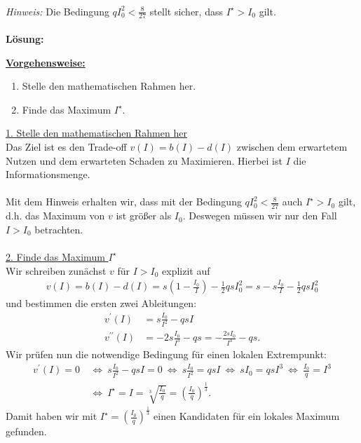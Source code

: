 \\
\textit{Hinweis:} Die Bedingung $q I_0^2 < \frac{8}{27}$ stellt sicher, dass $I^\star > I_0 $ gilt.\\
\\
\textbf{Lösung:}
\begin{mdframed}
\underline{\textbf{Vorgehensweise:}}
\begin{enumerate}
\item Stelle den mathematischen Rahmen her.
\item Finde das Maximum $I^\star$.
\end{enumerate}
\end{mdframed}

\underline{1. Stelle den mathematischen Rahmen her}\\
Das Ziel ist es den Trade-off $v(I) = b(I) - d(I)$ zwischen dem erwartetem Nutzen und dem erwarteten Schaden zu Maximieren. Hierbei ist $I$ die Informationsmenge.\\
\\
Mit dem Hinweis erhalten wir, dass mit der Bedingung $q I_0^2  < \frac{8}{27}$ auch $I^\star > I_0$ gilt, d.h. das Maximum von $v$ ist größer als $I_0$. Deswegen müssen wir nur den Fall $I > I_0$ betrachten.\\
\\
\underline{2. Finde das Maximum $I^\star$}\\
Wir schreiben zunächst $v$ für $I > I_0$ explizit auf
\begin{align*}
	v(I)
	=
	b(I) - d(I) 
	=
	s \left(1 - \frac{I_0}{I}\right)
	- \frac{1}{2} q s I_0^2
	=
	s - s \frac{I_0}{I} - \frac{1}{2} q s I_0^2
\end{align*}
und bestimmen die ersten zwei Ableitungen:
\begin{align*}
	v^\prime(I) &= s \frac{I_0}{I^2} - q s I\\
	v^{\prime \prime}(I) &= -2s \frac{I_0}{I^3} - qs
	= - \frac{2s I_0}{I^3} - qs. 
\end{align*}
Wir prüfen nun die notwendige Bedingung für einen lokalen Extrempunkt:
\begin{align*}
	v^\prime(I) = 0 
	&\ \Leftrightarrow \
	s \frac{I_0}{I^2} - q s I = 0
	\ \Leftrightarrow \
	s \frac{I_0}{I^2} = qs I 
	\ \Leftrightarrow \
	s I_0 = qs I^3
	\ \Leftrightarrow \ 
	 \frac{I_0}{q} =  I^3 \\
	 &\ \Leftrightarrow \
	   I^\star = I  = \sqrt[3]{\frac{I_0}{q}} = \left( \frac{I_0}{q}\right)^{\frac{1}{3}}.
\end{align*}
Damit haben wir mit $I^\star = \left( \frac{I_0}{q}\right)^{\frac{1}{3}}$ einen Kandidaten für ein lokales Maximum gefunden.\\
